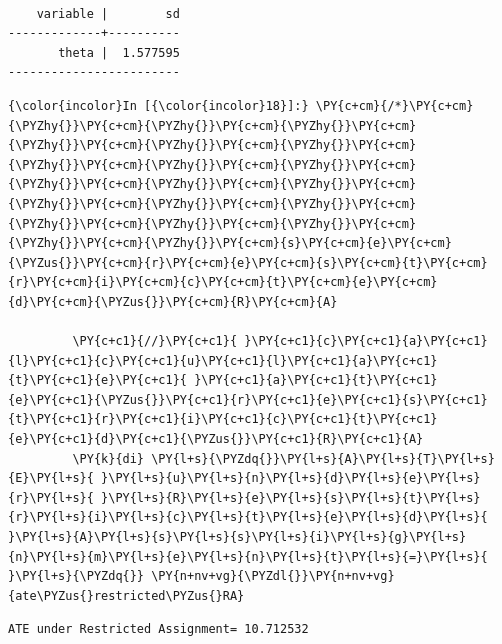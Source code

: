 \documentclass[11pt,notitlepage]{article}\usepackage[]{graphicx}\usepackage[]{color}
\makeatletter
\newenvironment{kframe}{%
 \def\at@end@of@kframe{}%
 \ifinner\ifhmode%
  \def\at@end@of@kframe{\end{minipage}}%
  \begin{minipage}{\columnwidth}%
 \fi\fi%
 \def\FrameCommand##1{\hskip\@totalleftmargin \hskip-\fboxsep
 \colorbox{shadecolor}{##1}\hskip-\fboxsep
     \hskip-\linewidth \hskip-\@totalleftmargin \hskip\columnwidth}%
 \MakeFramed {\advance\hsize-\width
   \@totalleftmargin\z@ \linewidth\hsize
   \@setminipage}}%
 {\par\unskip\endMakeFramed%
 \at@end@of@kframe}
\newenvironment{knitrout}{}{} %
\makeatother
\begin{document}
\begin{enumerate}[a)]
\begin{knitrout}
\begin{kframe}
    \begin{Verbatim}[commandchars=\\\{\}]

    variable |        sd
-------------+----------
       theta |  1.577595
------------------------

    \end{Verbatim}

    \begin{Verbatim}[commandchars=\\\{\}]
{\color{incolor}In [{\color{incolor}18}]:} \PY{c+cm}{/*}\PY{c+cm}{\PYZhy{}}\PY{c+cm}{\PYZhy{}}\PY{c+cm}{\PYZhy{}}\PY{c+cm}{\PYZhy{}}\PY{c+cm}{\PYZhy{}}\PY{c+cm}{\PYZhy{}}\PY{c+cm}{\PYZhy{}}\PY{c+cm}{\PYZhy{}}\PY{c+cm}{\PYZhy{}}\PY{c+cm}{\PYZhy{}}\PY{c+cm}{\PYZhy{}}\PY{c+cm}{\PYZhy{}}\PY{c+cm}{\PYZhy{}}\PY{c+cm}{\PYZhy{}}\PY{c+cm}{\PYZhy{}}\PY{c+cm}{\PYZhy{}}\PY{c+cm}{\PYZhy{}}\PY{c+cm}{\PYZhy{}}\PY{c+cm}{\PYZhy{}}\PY{c+cm}{\PYZhy{}}\PY{c+cm}{s}\PY{c+cm}{e}\PY{c+cm}{\PYZus{}}\PY{c+cm}{r}\PY{c+cm}{e}\PY{c+cm}{s}\PY{c+cm}{t}\PY{c+cm}{r}\PY{c+cm}{i}\PY{c+cm}{c}\PY{c+cm}{t}\PY{c+cm}{e}\PY{c+cm}{d}\PY{c+cm}{\PYZus{}}\PY{c+cm}{R}\PY{c+cm}{A}

         \PY{c+c1}{//}\PY{c+c1}{ }\PY{c+c1}{c}\PY{c+c1}{a}\PY{c+c1}{l}\PY{c+c1}{c}\PY{c+c1}{u}\PY{c+c1}{l}\PY{c+c1}{a}\PY{c+c1}{t}\PY{c+c1}{e}\PY{c+c1}{ }\PY{c+c1}{a}\PY{c+c1}{t}\PY{c+c1}{e}\PY{c+c1}{\PYZus{}}\PY{c+c1}{r}\PY{c+c1}{e}\PY{c+c1}{s}\PY{c+c1}{t}\PY{c+c1}{r}\PY{c+c1}{i}\PY{c+c1}{c}\PY{c+c1}{t}\PY{c+c1}{e}\PY{c+c1}{d}\PY{c+c1}{\PYZus{}}\PY{c+c1}{R}\PY{c+c1}{A}
         \PY{k}{di} \PY{l+s}{\PYZdq{}}\PY{l+s}{A}\PY{l+s}{T}\PY{l+s}{E}\PY{l+s}{ }\PY{l+s}{u}\PY{l+s}{n}\PY{l+s}{d}\PY{l+s}{e}\PY{l+s}{r}\PY{l+s}{ }\PY{l+s}{R}\PY{l+s}{e}\PY{l+s}{s}\PY{l+s}{t}\PY{l+s}{r}\PY{l+s}{i}\PY{l+s}{c}\PY{l+s}{t}\PY{l+s}{e}\PY{l+s}{d}\PY{l+s}{ }\PY{l+s}{A}\PY{l+s}{s}\PY{l+s}{s}\PY{l+s}{i}\PY{l+s}{g}\PY{l+s}{n}\PY{l+s}{m}\PY{l+s}{e}\PY{l+s}{n}\PY{l+s}{t}\PY{l+s}{=}\PY{l+s}{ }\PY{l+s}{\PYZdq{}} \PY{n+nv+vg}{\PYZdl{}}\PY{n+nv+vg}{ate\PYZus{}restricted\PYZus{}RA}
\end{Verbatim}

    \begin{Verbatim}[commandchars=\\\{\}]
ATE under Restricted Assignment= 10.712532
    \end{Verbatim}


\end{kframe}
\end{knitrout}
\end{enumerate}
\end{document}
